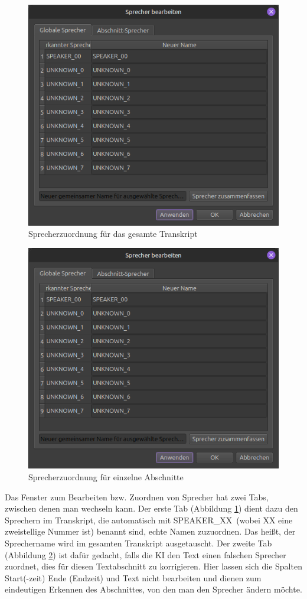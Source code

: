 \begin{figure}
    \centering
    \includegraphics[width=0.7\linewidth]{Bilder/Sprecher1}
    \caption[Sprecherzuordnung]{Sprecherzuordnung für das gesamte Transkript}
    \label{pic:sprecher-allg}
\end{figure}

\begin{figure}
\centering
\includegraphics[width=0.7\linewidth]{Bilder/Sprecher1}
\caption[Sprecher ändern]{Sprecherzuordnung für einzelne Abschnitte}
\label{pic:sprecher-spez}
\end{figure}

Das Fenster zum Bearbeiten bzw. Zuordnen von Sprecher hat zwei Tabs, zwischen denen man wechseln kann. Der erste Tab (Abbildung \ref{pic:sprecher-allg}) dient dazu den Sprechern im Transkript, die automatisch mit \glqq SPEAKER\_XX\grqq\ (wobei XX eine zweistellige Nummer ist) benannt sind, echte Namen zuzuordnen. Das heißt, der Sprechername wird im gesamten Transkript ausgetauscht. Der zweite Tab (Abbildung \ref{pic:sprecher-spez}) ist dafür gedacht, falls die \ac{KI} den Text einen falschen Sprecher zuordnet, dies für diesen Textabschnitt zu korrigieren. Hier lassen sich die Spalten Start(-zeit) Ende (Endzeit) und Text nicht bearbeiten und dienen zum eindeutigen Erkennen des Abschnittes, von den man den Sprecher ändern möchte.



